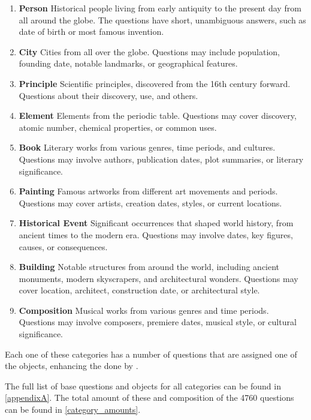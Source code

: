 \begin{enumerate}
	\item \textbf{Person} Historical people living from early antiquity to the present day from all around the globe. The questions have short, unambiguous answers, such as date of birth or most famous invention.
	\item \textbf{City} Cities from all over the globe. Questions may include population, founding date, notable landmarks, or geographical features.
	\item \textbf{Principle} Scientific principles, discovered from the 16th century forward. Questions about their discovery, use, and others.
	\item \textbf{Element} Elements from the periodic table. Questions may cover discovery, atomic number, chemical properties, or common uses.
	\item \textbf{Book} Literary works from various genres, time periods, and cultures. Questions may involve authors, publication dates, plot summaries, or literary significance.
	\item \textbf{Painting} Famous artworks from different art movements and periods. Questions may cover artists, creation dates, styles, or current locations.
	\item \textbf{Historical Event} Significant occurrences that shaped world history, from ancient times to the modern era. Questions may involve dates, key figures, causes, or consequences.
	\item \textbf{Building} Notable structures from around the world, including ancient monuments, modern skyscrapers, and architectural wonders. Questions may cover location, architect, construction date, or architectural style.
	\item \textbf{Composition} Musical works from various genres and time periods. Questions may involve composers, premiere dates, musical style, or cultural significance.
\end{enumerate}

Each one of these categories has a number of questions that are assigned one of the objects, enhancing the done by \citeauthor{factual_recall}.

The full list of base questions and objects for all categories can be found in \cref{appendixA}.
The total amount of these and composition of the 4760 questions can be found in \cref{category_amounts}.

